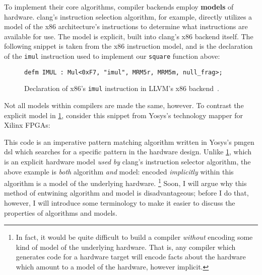 To implement their core algorithms,
  compiler backends 
  employ \textbf{models} of hardware.
clang's instruction selection algorithm,
  for example,
  directly utilizes a model
  of the x86 architecture's
  instructions
  to determine what instructions
  are available for use.
The model is explicit,
  built into clang's x86 backend itself.
The following snippet is
  taken from the x86 instruction model,
  and is the declaration
  of the \texttt{imul} instruction
  used to implement our \texttt{square}
  function above:
  
\vspace{4mm}
\begin{figure}[H]
    \centering
\begin{verbatim}
defm IMUL : Mul<0xF7, "imul", MRM5r, MRM5m, null_frag>;
\end{verbatim}
\caption{
Declaration of x86's
  \texttt{imul}
  instruction in LLVM's x86 
  backend~\cite{llvmx86tablegen}.
}
    \label{fig:intro:llvm-tablegen}
\end{figure}


Not all models within compilers
  are made the same, however.
To contrast the explicit model in
  \cref{fig:intro:llvm-tablegen},
  consider this snippet from Yosys's technology mapper
  for Xilinx FPGAs:

\vspace{4mm}


\noindent
This code is an imperative pattern matching
  algorithm
  written in Yosys's pmgen \gls{dsl}
  which searches for a specific pattern 
  in the hardware design.
Unlike \cref{fig:intro:llvm-tablegen},
  which is an explicit hardware model
  \textit{used by} clang's instruction selector algorithm,
  the above example is \textit{both} algorithm
  \textit{and} model:
  encoded \textit{implicitly}
  within this algorithm
  is a model of the underlying hardware.%
\footnote{In fact, it would be quite difficult
  to build a compiler
  \textit{without} encoding some kind 
  of model of the underlying hardware.
That is, any compiler which generates code
  for a hardware target
  will encode facts about the hardware
  which amount to a model of the hardware,
  however implicit.}
Soon, I will argue why this method
  of entwining algorithm
  and model
  is disadvantageous;
  before I do that, however,
  I will introduce some terminology
  to make it easier to discuss 
  the properties
  of algorithms and models.

